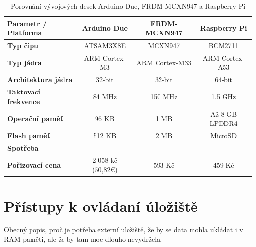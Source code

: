 \begin{table}[h]
    \centering
    \renewcommand{\arraystretch}{1.2}
    \begin{adjustbox}{max width=\textwidth} %
    \begin{tabular}{|l|c|c|c|}
        \hline
        \textbf{Parametr / Platforma}   & \textbf{Arduino Due}  & \textbf{FRDM-MCXN947} & \textbf{Raspberry Pi} \\ 
        \hline
        \textbf{Typ čipu}               & ATSAM3X8E             & MCXN947               & BCM2711               \\ 
        \hline
        \textbf{Typ jádra}              & ARM Cortex-M3         & ARM Cortex-M33        & ARM Cortex-A53        \\ 
        \hline
        \textbf{Architektura jádra}     & 32-bit                & 32-bit                & 64-bit                \\ 
        \hline
        \textbf{Taktovací frekvence}    & 84 MHz                & 150 MHz               & 1.5 GHz               \\ 
        \hline
        \textbf{Operační paměť}         & 96 KB                 & 1 MB                  & Až 8 GB LPDDR4        \\ 
        \hline
        \textbf{Flash paměť}            & 512 KB                & 2 MB                  & MicroSD               \\ 
        \hline
        \textbf{Spotřeba }              & -                     & -                     & -                     \\ 
        \hline
        \textbf{Pořizovací cena}        & 2 058 kč (50,82€)                    & 593 Kč                & 459 Kč  \\ 
        \hline
    \end{tabular}
    \end{adjustbox}
    \caption{Porovnání vývojových desek Arduino Due, FRDM-MCXN947 a Raspberry Pi}
    \label{tab:board-comparison}
\end{table}
\section{Přístupy k ovládaní úložiště}
Obecný popis, proč je potřeba externí uložiště, že by se data mohla ukládat i v RAM paměti, ale že by tam moc dlouho nevydržela, 

